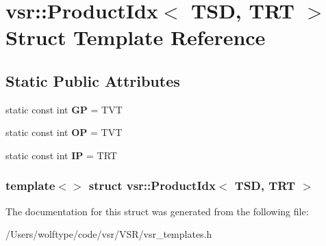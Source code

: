 \hypertarget{structvsr_1_1_product_idx_3_01_t_s_d_00_01_t_r_t_01_4}{\section{vsr\-:\-:Product\-Idx$<$ T\-S\-D, T\-R\-T $>$ Struct Template Reference}
\label{structvsr_1_1_product_idx_3_01_t_s_d_00_01_t_r_t_01_4}
}
\subsection*{Static Public Attributes}
\begin{DoxyCompactItemize}
\item 
\hypertarget{structvsr_1_1_product_idx_3_01_t_s_d_00_01_t_r_t_01_4_a36fac48c63fafdbe0692a53101759b5d}{static const int {\bfseries G\-P} = T\-V\-T}\label{structvsr_1_1_product_idx_3_01_t_s_d_00_01_t_r_t_01_4_a36fac48c63fafdbe0692a53101759b5d}

\item 
\hypertarget{structvsr_1_1_product_idx_3_01_t_s_d_00_01_t_r_t_01_4_a99474b38e57724b92a5377f7eb7649a9}{static const int {\bfseries O\-P} = T\-V\-T}\label{structvsr_1_1_product_idx_3_01_t_s_d_00_01_t_r_t_01_4_a99474b38e57724b92a5377f7eb7649a9}

\item 
\hypertarget{structvsr_1_1_product_idx_3_01_t_s_d_00_01_t_r_t_01_4_adb2144a21e4e03e29afa58be7298f6df}{static const int {\bfseries I\-P} = T\-R\-T}\label{structvsr_1_1_product_idx_3_01_t_s_d_00_01_t_r_t_01_4_adb2144a21e4e03e29afa58be7298f6df}

\end{DoxyCompactItemize}
\subsubsection*{template$<$$>$ struct vsr\-::\-Product\-Idx$<$ T\-S\-D, T\-R\-T $>$}



The documentation for this struct was generated from the following file\-:\begin{DoxyCompactItemize}
\item 
/\-Users/wolftype/code/vsr/\-V\-S\-R/vsr\-\_\-templates.\-h\end{DoxyCompactItemize}
